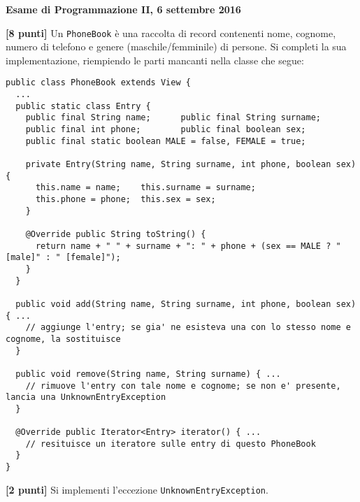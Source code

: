 \documentclass{article}[10pt]
\newcounter{esnu}
\newenvironment{esercizio}{\medskip \noindent {\bf Esercizio\addtocounter{esnu}{1} \arabic{esnu}}}{}
\begin{document}
\begin{center} {\bf Esame di Programmazione II, 6 settembre 2016}\end{center}

\begin{esercizio}
\textbf{[8 punti]}
Un \texttt{PhoneBook} \`e una raccolta di record contenenti nome, cognome,
numero di telefono e genere (maschile/femminile) di persone. Si completi
la sua implementazione, riempiendo le parti mancanti nella classe che segue:

{\scriptsize\begin{verbatim}
public class PhoneBook extends View {
  ...
  public static class Entry {
    public final String name;      public final String surname;
    public final int phone;        public final boolean sex;
    public final static boolean MALE = false, FEMALE = true;

    private Entry(String name, String surname, int phone, boolean sex) {
      this.name = name;    this.surname = surname;
      this.phone = phone;  this.sex = sex;
    }

    @Override public String toString() {
      return name + " " + surname + ": " + phone + (sex == MALE ? " [male]" : " [female]");
    }
  }

  public void add(String name, String surname, int phone, boolean sex) { ...
    // aggiunge l'entry; se gia' ne esisteva una con lo stesso nome e cognome, la sostituisce
  }

  public void remove(String name, String surname) { ...
    // rimuove l'entry con tale nome e cognome; se non e' presente, lancia una UnknownEntryException
  }

  @Override public Iterator<Entry> iterator() { ...
    // resituisce un iteratore sulle entry di questo PhoneBook
  }
}
\end{verbatim}}

\end{esercizio}

\begin{esercizio}
\textbf{[2 punti]}
Si implementi l'eccezione \texttt{UnknownEntryException}.
\end{esercizio}
\end{document}
